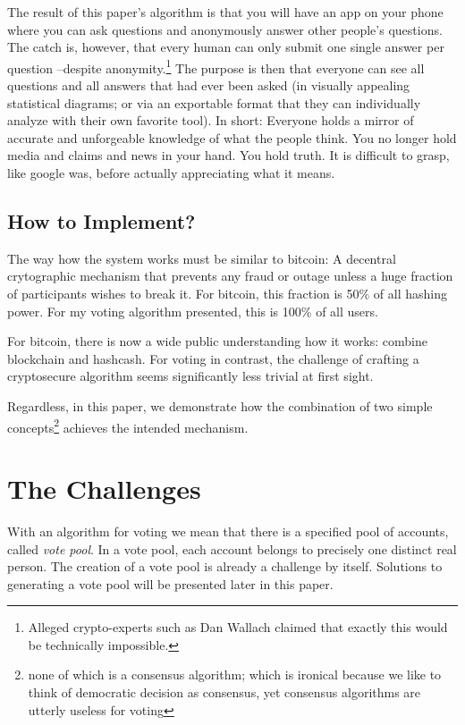 \documentclass{article}
\theoremstyle{definition}
\begin{document}
	The result of this paper's algorithm is that you will have an app on your phone where you can ask questions and anonymously answer other people's questions. The catch is, however, that every human can only submit one single answer per question --despite anonymity.\footnote{Alleged crypto-experts such as Dan Wallach claimed that exactly this would be technically impossible.} The purpose is then that everyone can see all questions and all answers that had ever been asked (in visually appealing statistical diagrams; or via an exportable format that they can individually analyze with their own favorite tool). In short: Everyone holds a mirror of accurate and unforgeable knowledge of what the people think. You no longer hold media and claims and news in your hand. You hold truth. It is difficult to grasp, like google was, before actually appreciating what it means.
	
	\subsection{How to Implement?}
	The way how the system works must be similar to bitcoin: A decentral crytographic mechanism that prevents any fraud or outage unless a huge fraction of participants wishes to break it. For bitcoin, this fraction is 50\% of all hashing power. For my voting algorithm presented, this is 100\% of all users.
	
	For bitcoin, there is now a wide public understanding how it works: combine blockchain and hashcash. For voting in contrast, the challenge of crafting a cryptosecure algorithm seems significantly less trivial at first sight. 
	
	Regardless, in this paper, we demonstrate how the combination of two simple concepts\footnote{none of which is a consensus algorithm; which is ironical because we like to think of democratic decision as consensus, yet consensus algorithms are utterly useless for voting} achieves the intended mechanism.
	
	\section{The Challenges}
	With an algorithm for voting we mean that there is a specified pool of accounts, called \emph{vote pool}. In a vote pool, each account belongs to precisely one distinct real person. The creation of a vote pool is already a challenge by itself. Solutions to generating a vote pool will be presented later in this paper.
	
\end{document}
